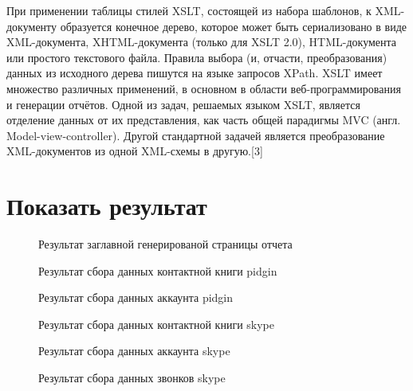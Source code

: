 При применении таблицы стилей XSLT, состоящей из набора шаблонов, к XML-документу образуется конечное дерево, которое может быть сериализовано в виде XML-документа, XHTML-документа (только для XSLT 2.0), HTML-документа или простого текстового файла. Правила выбора (и, отчасти, преобразования) данных из исходного дерева пишутся на языке запросов XPath.
XSLT имеет множество различных применений, в основном в области веб-программирования и генерации отчётов. Одной из задач, решаемых языком XSLT, является отделение данных от их представления, как часть общей парадигмы MVC (англ. Model-view-controller). Другой стандартной задачей является преобразование XML-документов из одной XML-схемы в другую.[3]
\chapter*{Показать результат}

\begin{figure}[h]
\caption{Результат заглавной генерированой страницы отчета}
\label{pic:xml_to_xslt1}
\end{figure}

\begin{figure}[h]
\caption{Результат сбора данных контактной книги pidgin}
\label{pic:xml_to_xslt2}
\end{figure}

\begin{figure}[h]
\caption{Результат сбора данных аккаунта pidgin}
\label{pic:xml_to_xslt3}
\end{figure}

\begin{figure}[h]
\caption{Результат сбора данных контактной книги skype}
\label{pic:xml_to_xslt4}
\end{figure}

\begin{figure}[h]
\caption{Результат сбора данных аккаунта skype}
\label{pic:xml_to_xslt5}
\end{figure}

\begin{figure}[h]
\caption{Результат сбора данных звонков skype}
\label{pic:xml_to_xslt6}
\end{figure}

